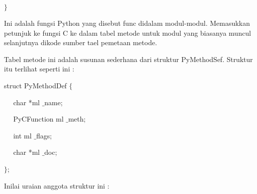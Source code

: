 \documentclass[a4paper,12pt]{report}
\begin{document}
\noindent 
 $  \}  $ \par
\vspace{12pt}
\vspace{12pt}
\noindent 
 \hspace*{0.5in} Ini adalah fungsi Python yang disebut func didalam modul-modul. Memasukkan petunjuk ke fungsi C ke dalam tabel metode untuk modul yang biasanya muncul selanjutnya dikode sumber tael pemetaan metode. \par
\noindent 
 \hspace*{0.5in} Tabel metode ini adalah susunan sederhana dari struktur PyMethodSef. Struktur itu terlihat seperti ini : \par
\noindent 
struct PyMethodDef  $  \{  $ \par
\noindent 
~~ char *ml $  \_  $name; \par
\noindent 
~~ PyCFunction ml $  \_  $meth; \par
\noindent 
~~ int ml $  \_  $flags; \par
\noindent 
~~ char *ml $  \_  $doc; \par
\noindent 
 $  \}  $; \par
\vspace{12pt}
\noindent 
Inilai uraian anggota struktur ini : \par
\noindent 
\end{document}

